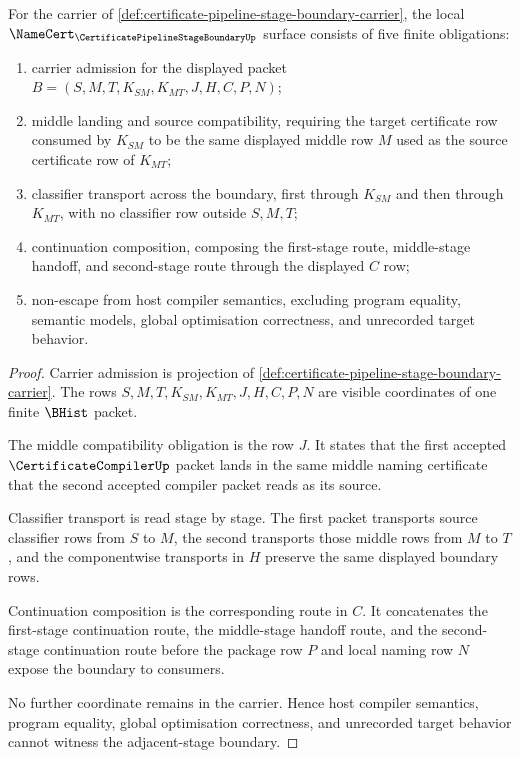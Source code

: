 \begin{theorem}
\label{thm:certificate-pipeline-stage-boundary-namecert-obligations}
For the carrier of \autoref{def:certificate-pipeline-stage-boundary-carrier}, the local $\NameCert_{\CertificatePipelineStageBoundaryUp}$ surface consists of five finite obligations:
\begin{enumerate}
\item carrier admission for the displayed packet $B=(S,M,T,K_{SM},K_{MT},J,H,C,P,N)$;
\item middle landing and source compatibility, requiring the target certificate row consumed by $K_{SM}$ to be the same displayed middle row $M$ used as the source certificate row of $K_{MT}$;
\item classifier transport across the boundary, first through $K_{SM}$ and then through $K_{MT}$, with no classifier row outside $S,M,T$;
\item continuation composition, composing the first-stage route, middle-stage handoff, and second-stage route through the displayed $C$ row;
\item non-escape from host compiler semantics, excluding program equality, semantic models, global optimisation correctness, and unrecorded target behavior.
\end{enumerate}
\end{theorem}
\begin{proof}
Carrier admission is projection of \autoref{def:certificate-pipeline-stage-boundary-carrier}. The rows $S,M,T,K_{SM},K_{MT},J,H,C,P,N$ are visible coordinates of one finite $\BHist$ packet.

The middle compatibility obligation is the row $J$. It states that the first accepted $\CertificateCompilerUp$ packet lands in the same middle naming certificate that the second accepted compiler packet reads as its source.

Classifier transport is read stage by stage. The first packet transports source classifier rows from $S$ to $M$, the second transports those middle rows from $M$ to $T$, and the componentwise transports in $H$ preserve the same displayed boundary rows.

Continuation composition is the corresponding route in $C$. It concatenates the first-stage continuation route, the middle-stage handoff route, and the second-stage continuation route before the package row $P$ and local naming row $N$ expose the boundary to consumers.

No further coordinate remains in the carrier. Hence host compiler semantics, program equality, global optimisation correctness, and unrecorded target behavior cannot witness the adjacent-stage boundary.
\end{proof}

